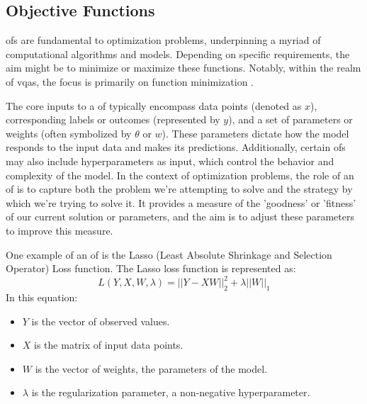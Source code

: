 \documentclass[
  a4paper,  %
  twoside,  %
  bibliography=totoc,
  headsepline,
  cleardoublepage=empty,
  parskip=half,
  draft=false
]{scrbook}
\begin{document}
\subsection{Objective Functions}
\label{subsec:objectiveFunctions}
\glspl{of} are fundamental to optimization problems, underpinning a myriad of computational algorithms and models.
Depending on specific requirements, the aim might be to minimize or maximize these functions.
Notably, within the realm of \glspl{vqa}, the focus is primarily on function minimization \cite{Weinan2017}.

The core inputs to a \gls{of} typically encompass data points (denoted as $x$), corresponding labels or outcomes (represented by $y$), and a set of parameters or weights (often symbolized by $\theta$ or $w$).
These parameters dictate how the model responds to the input data and makes its predictions.
Additionally, certain \glspl{of} may also include hyperparameters as input, which control the behavior and complexity of the model.
In the context of optimization problems, the role of an \gls{of} is to capture both the problem we're attempting to solve and the strategy by which we're trying to solve it.
It provides a measure of the 'goodness' or 'fitness' of our current solution or parameters, and the aim is to adjust these parameters to improve this measure.

One example of an \gls{of} is the Lasso (Least Absolute Shrinkage and Selection Operator) Loss function.
The Lasso loss function is represented as:
\[
L(Y, X, W, \lambda) = ||Y - XW||^2_2 + \lambda ||W||_1
\]
In this equation:

\begin{itemize}
  \item \(Y\) is the vector of observed values.
  \item \(X\) is the matrix of input data points.
  \item \(W\) is the vector of weights, the parameters of the model.
  \item \(\lambda\) is the regularization parameter, a non-negative hyperparameter.
\end{itemize}
\end{document}
